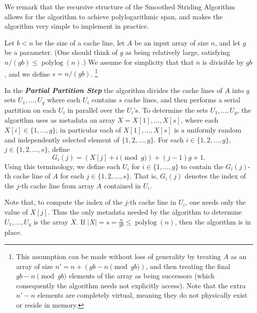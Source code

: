 \documentclass[11pt]{article}
\newcommand{\polylog}{\operatorname{polylog}}
\newcommand{\defn}[1]{{\textit{\textbf{\boldmath #1}}}}
\renewcommand{\paragraph}[1]{\vspace{0.09in}\noindent{\bf \boldmath #1.}}
\theoremstyle{remark}
\theoremstyle{remark}
\begin{document}
We remark that the recursive structure of the Smoothed Striding
Algorithm allows for the algorithm to achieve polylogarithmic
span, and makes the algorithm very simple to implement in
practice. 

\paragraph{Formal Algorithm Description} Let $b < n$ be the size
of a cache line, let $A$ be an input array of size $n$, and let
$g$ be a parameter. (One should think of $g$ as being relatively
large, satisfying $n/(gb) \le \polylog(n)$.)  We assume for
simplicity that that $n$ is divisible by $gb$, and we define $s =
n/(gb)$. \footnote{This assumption can be made without loss of
  generality by treating $A$ as an array of size $n' = n + {(gb -
  n \pmod {gb})}$, and then treating the final $gb - n \pmod
  {gb}$ elements of the array as being successors (which
  consequently the algorithm needs not explicitly access). Note
  that the extra $n' - n$ elements are completely virtual,
  meaning they do not physically exist or reside in memory.
}

In the \defn{Partial Partition Step} the algorithm divides the
cache lines of $A$ into $g$ sets $U_1, \ldots, U_{g}$ where each
$U_i$ contains $s$ cache lines, and then performs a serial
partition on each $U_i$ in parallel over the $U_i$'s. To
determine the sets $U_1, \ldots, U_{g}$, the algorithm uses as
metadata an array $X = X[1], \ldots, X[s]$, where each $X[i] \in
\{1, \ldots, g\}$; in particular each of $X[1], \ldots, X[s]$ is
a uniformly random and independently selected element of $\{1, 2,
\ldots, g\}$. For each $i \in \{1, 2, \ldots, g\}$, $j \in \{1,
2, \ldots, s\}$, define $$G_i(j) = (X[j] + i \pmod g) + (j - 1)g
+ 1.$$ Using this terminology, we define each $U_i$ for $i \in
\{1, \ldots, g\}$ to contain the $G_i(j)$-th cache line of $A$
for each $j \in \{1, 2, \ldots, s\}$. That is, $G_i(j)$ denotes
the index of the $j$-th cache line from array $A$ contained in
$U_i$.

Note that, to compute the index of the $j$-th cache line in $U_i$,
one needs only the value of $X[j]$. Thus the only metadata needed by
the algorithm to determine $U_1, \ldots, U_g$ is the array
$X$. If $|X| = s = \frac{n}{gb} \le \polylog(n)$, then
the algorithm is in place.
  
\end{document}
